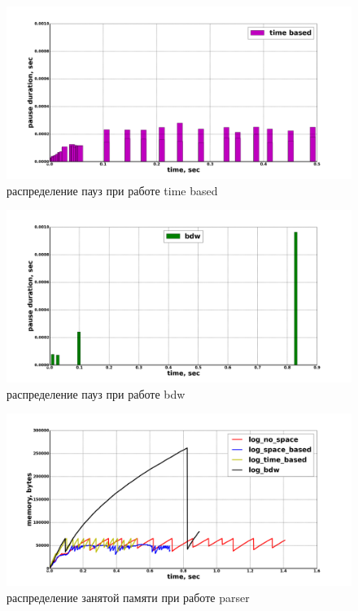 \begin{figure}[ph]
\caption{\label{pic:time-based-pause}распределение пауз при работе time based}
\includegraphics[width=1\linewidth]{Bakradze/time_based.png}
\end{figure}

\begin{figure}[ph]
\caption{\label{pic:pause-bdw}распределение пауз при работе bdw}
\includegraphics[width=1\linewidth]{Bakradze/bdw.png}
\end{figure}

\begin{figure}[ph]
\caption{\label{pic:allocated}распределение занятой памяти при работе parser}
\includegraphics[width=1\linewidth]{Bakradze/all-allocated.png}
\end{figure}

